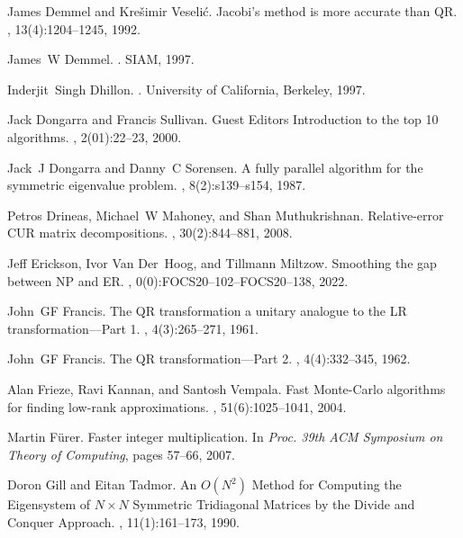 \documentclass{article}
\begin{document}
\begin{thebibliography}{10}
James Demmel and Kre{\v{s}}imir Veseli{\'c}.
\newblock Jacobi’s method is more accurate than {QR}.
, 13(4):1204--1245, 1992.

James~W Demmel.
.
\newblock SIAM, 1997.

Inderjit~Singh Dhillon.
.
\newblock University of California, Berkeley, 1997.

Jack Dongarra and Francis Sullivan.
\newblock Guest {Editors Introduction} to the top 10 algorithms.
, 2(01):22--23, 2000.

Jack~J Dongarra and Danny~C Sorensen.
\newblock A fully parallel algorithm for the symmetric eigenvalue problem.
, 8(2):s139--s154, 1987.

Petros Drineas, Michael~W Mahoney, and Shan Muthukrishnan.
\newblock Relative-error {CUR} matrix decompositions.
, 30(2):844--881, 2008.

Jeff Erickson, Ivor Van Der~Hoog, and Tillmann Miltzow.
\newblock Smoothing the gap between {NP and ER}.
, 0(0):FOCS20--102--FOCS20--138, 2022.

John~GF Francis.
\newblock The {QR} transformation a unitary analogue to the {LR} transformation—{P}art 1.
, 4(3):265--271, 1961.

John~GF Francis.
\newblock The {QR} transformation—{P}art 2.
, 4(4):332--345, 1962.

Alan Frieze, Ravi Kannan, and Santosh Vempala.
\newblock Fast{ Monte-Carlo} algorithms for finding low-rank approximations.
, 51(6):1025--1041, 2004.

Martin F{\"u}rer.
\newblock Faster integer multiplication.
\newblock In {\em Proc. 39th ACM Symposium on Theory of Computing}, pages 57--66, 2007.

Doron Gill and Eitan Tadmor.
\newblock An {$O(N^2)$ Method for Computing the Eigensystem of $N\times N$ Symmetric Tridiagonal Matrices by the Divide and Conquer Approach}.
, 11(1):161--173, 1990.


\end{thebibliography}
\end{document}
